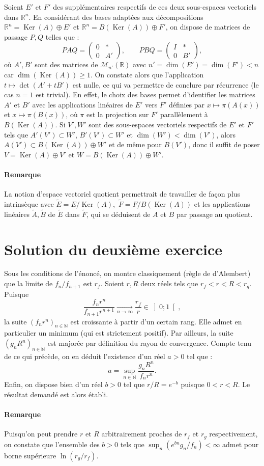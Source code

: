 Soient $E'$ et $F'$ des supplémentaires respectifs de ces deux sous-espaces vectoriels dans $\mathbb R^n$. En considérant des bases adaptées aux décompositions $\mathbb R^n = \operatorname{Ker}(A)\oplus E'$ et $\mathbb R^n = B(\operatorname{Ker}(A))\oplus F'$, on dispose de matrices de passage $P,Q$  telles que :
\[
PAQ = \begin{pmatrix}0 & *\\0 & A'\end{pmatrix},
\qquad
PBQ = \begin{pmatrix}I & *\\0 & B'\end{pmatrix},
\]
où $A',B'$ sont des matrices de $\mathscr M_{n'}(\mathbb R)$ avec $n' = \dim(E') = \dim(F') < n$ car $\dim(\operatorname{Ker}(A)) \geqslant 1$.
On constate alors que l'application $t\mapsto \det(A' + t B')$ est nulle, ce qui va permettre de conclure par récurrence (le cas $n = 1$ est trivial). En effet, 
le choix des bases permet d'identifier les matrices $A'$ et $B'$ avec les applications linéaires de $E'$ vers $F'$ définies par $x \mapsto \pi(A(x))$ et $x \mapsto \pi(B(x))$, où $\pi$ est la projection sur $F'$ parallèlement à $B(\operatorname{Ker}(A))$.
Si $V',W'$ sont des sous-espaces vectoriels respectifs de $E'$ et $F'$ tels que $A'(V') \subset W'$, $B'(V') \subset W'$ et $\dim(W') < \dim(V')$, alors $A(V') \subset B(\operatorname{Ker}(A)) \oplus W'$ et de même pour $B(V')$, donc il suffit de poser $V = \operatorname{Ker}(A) \oplus V'$ et $W = B(\operatorname{Ker}(A)) \oplus W'$.

\paragraph{Remarque}
La notion d'espace vectoriel quotient permettrait de travailler de façon plus intrinsèque avec $\tilde E = E/\operatorname{Ker}(A)$,\ $\tilde F = F/B(\operatorname{Ker}(A))$ et les applications linéaires $\tilde A, \tilde B$ de $\tilde E$ dans $\tilde F$, qui se déduisent de $A$ et $B$ par passage au quotient.

\section{Solution du deuxième exercice} %

Sous les conditions de l'énoncé, on montre classiquement (règle de d'Alembert) que la limite de $f_n/f_{n+1}$ est $r_f$.
Soient $r,R$ deux réels tels que $r_f < r < R < r_g$. Puisque
$$
\frac{f_n r^n}{f_{n+1}r^{n+1}} \xrightarrow[n\to\infty]{} \frac{r_f}{r} \in \left]0;1\right[,
$$
la suite $(f_n r^n)_{n\in\mathbb N}$ est croissante à partir d'un certain rang. Elle admet en particulier un minimum (qui est strictement positif).
Par ailleurs, la suite $(g_n R^n)_{n\in\mathbb N}$ est majorée par définition du rayon de convergence. Compte tenu de ce qui précède, on en déduit l'existence d'un réel $a > 0$ tel que :
$$
a = \sup_{n\in\mathbb N} \frac{g_n R^n}{f_n r^n}.
$$
Enfin, on dispose bien d'un réel $b > 0$ tel que $r/R = e^{-b}$ puisque $0 < r < R$.
Le résultat demandé est alors établi.

\paragraph{Remarque}
Puisqu'on peut prendre $r$ et $R$ arbitrairement proches de $r_f$ et $r_g$ respectivement, on constate que l'ensemble des $b > 0$ tels que $\sup_n (e^{bn} g_n/f_n) < \infty$ admet pour borne supérieure $\ln(r_g/r_f)$.
